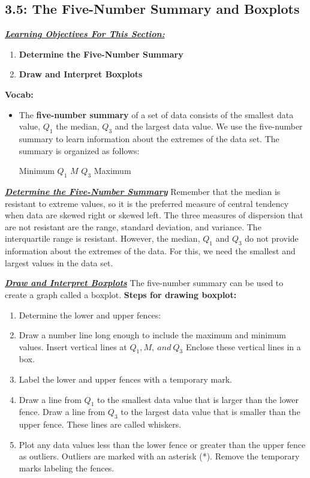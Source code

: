 \documentclass{report}
\begin{document}
    \subsection{3.5: The Five-Number Summary and Boxplots}
    \bigbreak \noindent 
    \textbf{\textit{\underline{Learning Objectives For This Section:}}}
    \begin{enumerate}
        \item \textbf{Determine the Five-Number Summary}
        \item \textbf{Draw and Interpret Boxplots}
    \end{enumerate}
    \bigbreak \noindent 
    \textbf{Vocab:}
    \begin{itemize}
        \item The \textbf{five-number summary} of a set of data consists of the smallest data value, $Q_{1} $  the median, $Q_{3} $  and the largest data value. We use the five-number summary to learn information about the extremes of the data set. The summary is organized as follows:
        \begin{center}
           Minimum $Q_{1} $ $M$ $Q_{3} $  Maximum
        \end{center}
    \end{itemize}

    \bigbreak \noindent \bigbreak \noindent 
    \textbf{\textit{\underline{Determine the Five-Number Summary}}}
    \bigbreak \noindent 
    Remember that the median is resistant to extreme values, so it is the preferred measure of central tendency when data are skewed right or skewed left.
    \bigbreak \noindent 
    The three measures of dispersion that are not resistant are the range, standard deviation, and variance. The interquartile range is resistant. However, the median, $Q_{1} $ and $Q_{3} $ do not provide information about the extremes of the data. For this, we need the smallest and largest values in the data set.

    \bigbreak \noindent \bigbreak \noindent 
    \textbf{\textit{\underline{Draw and Interpret Boxplots}}}
    \bigbreak \noindent 
    The five-number summary can be used to create a graph called a boxplot.
    \bigbreak \noindent 
    \textbf{Steps for drawing boxplot:}
    \bigbreak \noindent 
    \begin{enumerate}
        \item Determine the lower and upper fences:
        \item Draw a number line long enough to include the maximum and minimum values. Insert vertical lines at $Q_{1}, M,\ and\ Q_{3} $  Enclose these vertical lines in a box.
        \item Label the lower and upper fences with a temporary mark.
        \item Draw a line from $Q_{1} $ to the smallest data value that is larger than the lower fence. Draw a line from $Q_{3} $  to the largest data value that is smaller than the upper fence. These lines are called whiskers.
        \item Plot any data values less than the lower fence or greater than the upper fence as outliers. Outliers are marked with an asterisk (*). Remove the temporary marks labeling the fences.
    \end{enumerate}
\end{document}
